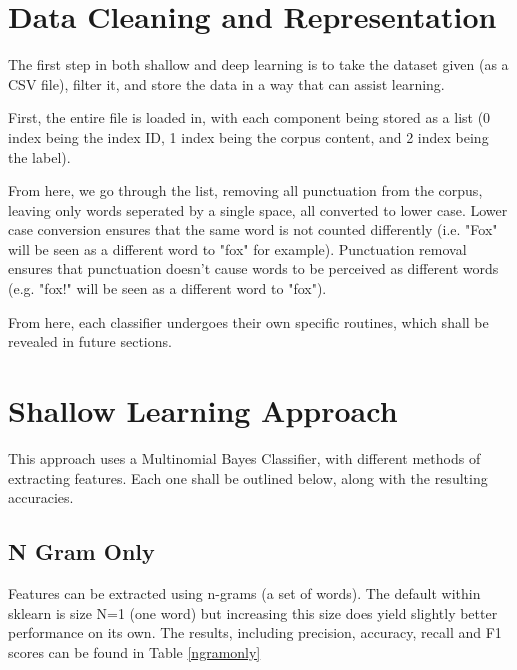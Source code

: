 \documentclass[12pt]{article}
\begin{document}
\maketitle

\section{Data Cleaning and Representation}
The first step in both shallow and deep learning is to take the dataset given (as a CSV file), filter it,
and store the data in a way that can assist learning.

First, the entire file is loaded in, with each component being stored as a list (0 index being the index ID, 1 index being the corpus content, and 2 index being
the label).

From here, we go through the list, removing all punctuation from the corpus, leaving only words seperated by a single space, all converted to lower case.
Lower case conversion ensures that the same word is not counted differently (i.e. "Fox" will be seen as a different word to "fox" for example). Punctuation removal
ensures that punctuation doesn't cause words to be perceived as different words (e.g. "fox!" will be seen as a different word to "fox").

From here, each classifier undergoes their own specific routines, which shall be revealed in future sections.

\section{Shallow Learning Approach}
This approach uses a Multinomial Bayes Classifier, with different methods of extracting features. Each one shall be outlined below, along with the resulting accuracies.

\subsection{N Gram Only}
Features can be extracted using n-grams (a set of words). The default within sklearn is size N=1 (one word) but increasing this size does yield slightly better performance on its own.
The results, including precision, accuracy, recall and F1 scores can be found in Table \ref{ngramonly}
\end{document}
